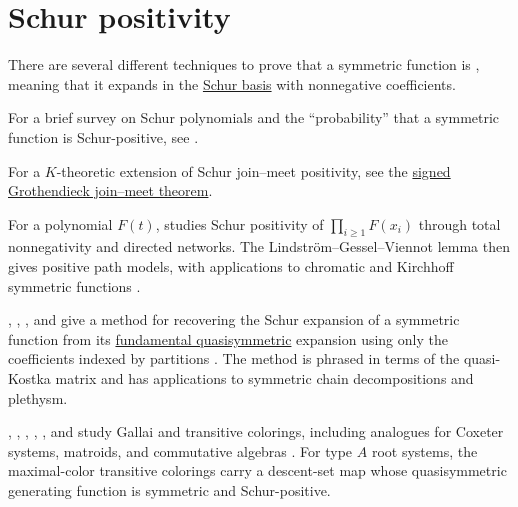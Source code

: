 
\section[schurPositivity]{Schur positivity}

There are several different techniques to prove that a symmetric function is
\label{schurPositiveDefinition}, meaning that it
expands in the \hyperref[schurS]{Schur basis} with nonnegative coefficients.

For a brief survey on Schur polynomials and the \enquote{probability} that a
symmetric function is Schur-positive, see
\cite{Patrias2019,PatriasWilligenburg2018}.

For a $K$-theoretic extension of Schur join--meet positivity, see the
\hyperref[grothendieckJoinMeet]{signed Grothendieck join--meet theorem}.

For a polynomial $F(t)$,  studies Schur positivity of
$\prod_{i\geq1}F(x_i)$ through total nonnegativity and directed networks.
The Lindstr{\"o}m--Gessel--Viennot lemma then gives positive path models, with
applications to chromatic and Kirchhoff symmetric functions
\cite{Siegl2026x}.

, , , and
 give a method for recovering the Schur expansion of a
symmetric function from its \hyperref[gessel]{fundamental quasisymmetric}
expansion using only the coefficients indexed by partitions
\cite{OrellanaSaliolaSchillingZabrocki2024}.  The method is phrased in
terms of the quasi-Kostka matrix and has applications to symmetric chain
decompositions and plethysm.

, , ,
, , and  study Gallai and
transitive colorings, including analogues for Coxeter systems, matroids, and
commutative algebras \cite{AdinBerensteinGreensteinLiMarmorRoichman2023x}.
For type $A$ root systems, the maximal-color transitive colorings carry a
descent-set map whose quasisymmetric generating function is symmetric and
Schur-positive.

